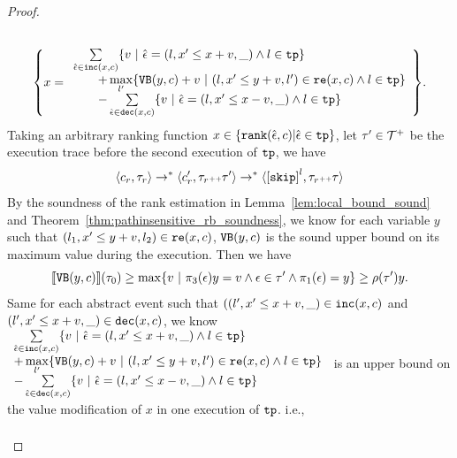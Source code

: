 \begin{proof}
\begin{itemize}
\[\begin{array}{l}
   \\
   \left\{ x = \begin{array}{l}
  \sum\limits_{\absevent \in \inc(x, c) }
   \left\{ v ~\middle\vert~ \absevent = (l, x' \leq x + v, \_) \land l \in \tpath\right\}
   \\ \qquad 
   + \max\limits_{l' }
      \left\{ \varinvar(y, c) + v ~\middle\vert~ (l, x' \leq y + v, l') \in \reset(x, c) \land l \in \tpath\right\}
      \\ \qquad 
     - \sum\limits_{ \absevent \in \dec(x, c) }\left\{ 
       v ~\middle\vert~ \absevent = (l, x' \leq x - v, \_) \land l \in \tpath 
       \right\}
     \end{array}
   \right\}.
   \end{array}
 \]
 Taking an arbitrary ranking function $x \in \left\{ \rank(\absevent, c) | \absevent \in \tpath \right\}$,
 let $\mathtt{\tau}' \in \mathcal{T}^{+}$ be the execution trace before the second execution of $\mathtt{tp}$, we have
 \[
   \config{c_r, \trace_r} \to^* \config{c_r', \trace_r \tracecat \trace'} \to^* \config{\clabel{\eskip}^{l}, \trace_r \tracecat \trace}
 \]
   By the soundness of the rank estimation in Lemma~\ref{lem:local_bound_sound} and Theorem~\ref{thm:pathinsensitive_rb_soundness}, we know 
   for each variable $y$ such that $(l_1, x' \leq y + v, l_2) \in \mathtt{re}(x, c) $,
   ${\mathtt{VB}}(y, c)$ is the sound upper bound on its maximum value during the execution. 
   Then we have
   \[
     \econfig{\varinvar(y, c)}(\trace_0) \geq \max \left\{ v ~|~  \pi_3(\event) y = v \land \event \in \trace' \land \pi_1(\event) = y\right\}  \geq \env(\trace') y. 
   \]
   Same for each abstract event such that $((l', x' \leq x + v, \_) \in \mathtt{inc}(x, c) $ and $(l', x' \leq x + v, \_) \in \mathtt{dec}(x, c)$,
   we know 
   \\
   $      
   \begin{array}{l}
    \sum\limits_{\absevent \in \inc(x, c) }
     \left\{ v ~\middle\vert~ \absevent = (l, x' \leq x + v, \_) \land l \in \tpath\right\}
     \\  
     + \max\limits_{l' }
        \left\{ \varinvar(y, c) + v ~\middle\vert~ (l, x' \leq y + v, l') \in \reset(x, c) \land l \in \tpath\right\}
        \\
       - \sum\limits_{ \absevent \in \dec(x, c) }\left\{ 
         v ~\middle\vert~ \absevent = (l, x' \leq x - v, \_) \land l \in \tpath 
         \right\}
       \end{array}
   $ is an upper bound on the value modification of $x$ in one execution of $\mathtt{tp}$.
 i.e.,
   \[
     \begin{array}{l}

\end{array}\]
\end{itemize}
\end{proof}
